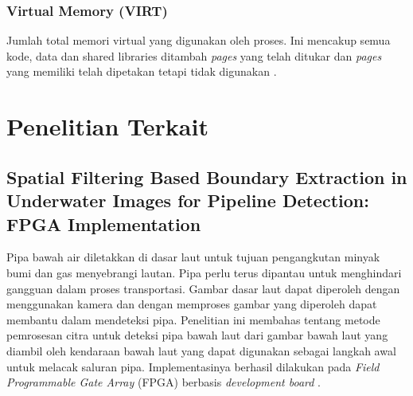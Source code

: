
\subsubsection{Virtual Memory (VIRT)}

Jumlah total memori virtual yang digunakan oleh proses. Ini mencakup semua kode, data
dan shared  libraries ditambah \textit{pages} yang telah ditukar dan \textit{pages} yang memiliki
telah dipetakan tetapi tidak digunakan . 



\section{Penelitian Terkait}
\subsection{Spatial Filtering Based Boundary Extraction in Underwater Images for Pipeline Detection: FPGA Implementation}
Pipa bawah air diletakkan di dasar laut untuk tujuan pengangkutan minyak bumi dan gas menyebrangi lautan. Pipa perlu terus dipantau untuk menghindari gangguan dalam proses transportasi. Gambar dasar laut dapat diperoleh dengan menggunakan kamera dan dengan memproses gambar yang diperoleh dapat membantu dalam mendeteksi pipa. Penelitian ini membahas tentang metode pemrosesan citra untuk deteksi pipa bawah laut dari gambar bawah laut yang diambil oleh kendaraan bawah laut yang dapat digunakan sebagai langkah awal untuk melacak saluran pipa. Implementasinya berhasil dilakukan pada \textit{Field Programmable Gate Array} (FPGA) berbasis \textit{development board} .

